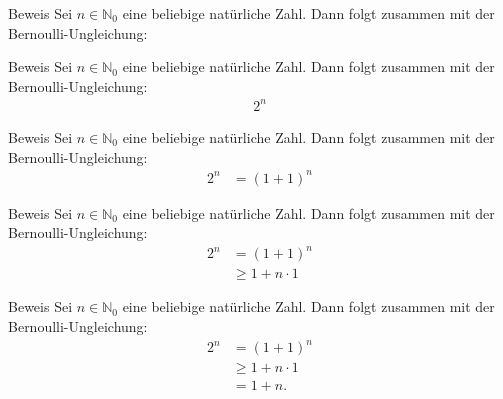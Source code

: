 \documentclass[10pt]{beamer}
\def\bN{\mathbb{N}}
\begin{document}
\begin{frame}{Beweis}
    Sei \( n \in \bN_{0} \) eine beliebige natürliche Zahl. Dann folgt zusammen mit der Bernoulli-Ungleichung:
\end{frame}



\begin{frame}{Beweis}
    Sei \( n \in \bN_{0} \) eine beliebige natürliche Zahl. Dann folgt zusammen mit der Bernoulli-Ungleichung:
    \begin{align*}
        2^{n}
    \end{align*}
\end{frame}



\begin{frame}{Beweis}
    Sei \( n \in \bN_{0} \) eine beliebige natürliche Zahl. Dann folgt zusammen mit der Bernoulli-Ungleichung:
    \begin{align*}
        2^{n}
        & = \left( 1 + 1 \right)^{n}
    \end{align*}
\end{frame}



\begin{frame}{Beweis}
    Sei \( n \in \bN_{0} \) eine beliebige natürliche Zahl. Dann folgt zusammen mit der Bernoulli-Ungleichung:
    \begin{align*}
        2^{n}
        & = \left( 1 + 1 \right)^{n} \\
        & \geq 1 + n \cdot 1
    \end{align*}
\end{frame}



\begin{frame}{Beweis}
    Sei \( n \in \bN_{0} \) eine beliebige natürliche Zahl. Dann folgt zusammen mit der Bernoulli-Ungleichung:
    \begin{align*}
        2^{n}
        & = \left( 1 + 1 \right)^{n} \\
        & \geq 1 + n \cdot 1 \\
        & = 1 + n.
    \end{align*}
\end{frame}
\end{document}
